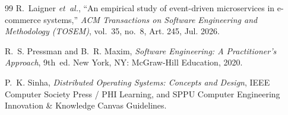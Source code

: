 \documentclass[oneside,a4paper,12pt]{report}
\begin{document}
\begin{thebibliography}{99}
R.~Laigner \emph{et~al.}, ``An empirical study of event-driven microservices in e-commerce systems,'' \emph{ACM Transactions on Software Engineering and Methodology (TOSEM)}, vol.~35, no.~8, Art. 245, Jul. 2026.

R.~S. Pressman and B.~R. Maxim, \emph{Software Engineering: A Practitioner's Approach}, 9th~ed. New York, NY: McGraw-Hill Education, 2020.

P.~K. Sinha, \emph{Distributed Operating Systems: Concepts and Design}, IEEE Computer Society Press / PHI Learning, and SPPU Computer Engineering Innovation \& Knowledge Canvas Guidelines.

\end{thebibliography}

\end{document}
